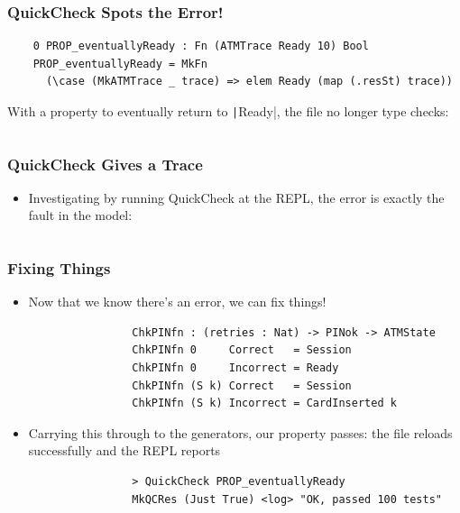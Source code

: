 \documentclass[compress,handout]{beamer}
\begin{document}
\begin{frame}[fragile]
  \frametitle{QuickCheck Spots the Error!}

  \begin{verbatim}
    0 PROP_eventuallyReady : Fn (ATMTrace Ready 10) Bool
    PROP_eventuallyReady = MkFn
      (\case (MkATMTrace _ trace) => elem Ready (map (.resSt) trace))
  \end{verbatim}

  \pause

  With a property to eventually return to \texttt|Ready|, the file no
  longer type checks:

  \inputminted{Idris}{qc-things/ATM-qc-error.idr}

\end{frame}


\begin{frame}[fragile]
  \frametitle{QuickCheck Gives a Trace}

  \begin{itemize}
    \item<1-> Investigating by running QuickCheck at the REPL, the error is
              exactly the fault in the model:
              \vspace*{1mm}
              \inputminted[fontsize=\scriptsize]{Idris}{qc-things/qc-trace-4.idr}
              \vspace*{-4mm}
  \end{itemize}

\end{frame}




\begin{frame}[fragile]
  \frametitle{Fixing Things}

  \begin{itemize}
    \item<1-> Now that we know there's an error, we can fix things!
              \begin{verbatim}
                ChkPINfn : (retries : Nat) -> PINok -> ATMState
                ChkPINfn 0     Correct   = Session
                ChkPINfn 0     Incorrect = Ready
                ChkPINfn (S k) Correct   = Session
                ChkPINfn (S k) Incorrect = CardInserted k
              \end{verbatim}

    \item<2-> Carrying this through to the generators, our property passes: the
              file reloads successfully and the REPL reports
              \begin{verbatim}
                > QuickCheck PROP_eventuallyReady
                MkQCRes (Just True) <log> "OK, passed 100 tests"
              \end{verbatim}
  \end{itemize}

\end{frame}
\end{document}
